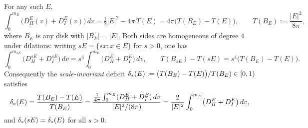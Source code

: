 \begin{proposition}
\label{prop:scale}
For any such $E$,
\begin{equation}\label{eq:identity-gen}
   \int_0^{m_E}\bigl(D_H^E(v)+D_I^E(v)\bigr)\,dv
   =\tfrac12|E|^2-4\pi\,T(E)
   =4\pi\bigl(T(B_E)-T(E)\bigr),
   \qquad T(B_E):=\frac{|E|^2}{8\pi},
\end{equation}
where $B_E$ is any disk with $|B_E|=|E|$. Both sides are homogeneous of
degree $4$ under dilations: writing $sE=\{sx:x\in E\}$ for $s>0$, one has
\begin{equation}\label{eq:homog}
   \int_0^{m_{sE}}\bigl(D_H^{sE}+D_I^{sE}\bigr)\,dv
   =s^4\int_0^{m_E}\bigl(D_H^{E}+D_I^{E}\bigr)\,dv,
   \qquad
   T(B_{sE})-T(sE)=s^4\bigl(T(B_E)-T(E)\bigr).
\end{equation}
Consequently the \emph{scale-invariant} deficit
$\delta_{*}(E):=\bigl(T(B_E)-T(E)\bigr)/T(B_E)\in[0,1)$ satisfies
\begin{equation}\label{eq:scaleinv-identity}
   \delta_{*}(E)
   =\frac{T(B_E)-T(E)}{T(B_E)}
   =\frac{\frac{1}{4\pi}\int_0^{m_E}(D_H^E+D_I^E)\,dv}{|E|^2/(8\pi)}
   =\frac{2}{|E|^2}\int_0^{m_E}\bigl(D_H^E+D_I^E\bigr)\,dv ,
\end{equation}
and $\delta_{*}(sE)=\delta_{*}(E)$ for all $s>0$.
\end{proposition}

